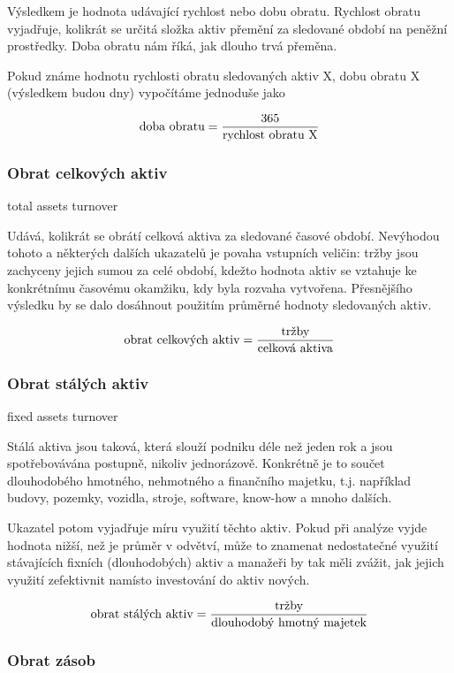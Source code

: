 Výsledkem je hodnota udávající rychlost nebo dobu obratu. Rychlost obratu vyjadřuje, kolikrát se určitá složka aktiv přemění za sledované období na peněžní prostředky. Doba obratu nám říká, jak dlouho trvá přeměna.

Pokud známe hodnotu rychlosti obratu sledovaných aktiv X, dobu obratu X (výsledkem budou dny) vypočítáme jednoduše jako 

$$\text{doba obratu} = \dfrac{\text{365}}{\text{rychlost obratu X}}$$

\subsubsection{Obrat celkových aktiv}

total assets turnover

Udává, kolikrát se obrátí celková aktiva za sledované časové období. Nevýhodou tohoto a některých dalších ukazatelů je povaha vstupních veličin: tržby jsou zachyceny jejich sumou za celé období, kdežto hodnota aktiv se vztahuje ke konkrétnímu časovému okamžiku, kdy byla rozvaha vytvořena. Přesnějšího výsledku by se dalo dosáhnout použitím průměrné hodnoty sledovaných aktiv. 

$$\text{obrat celkových aktiv} = \dfrac{\text{tržby}}{\text{celková aktiva}}$$

\subsubsection{Obrat stálých aktiv}

fixed assets turnover

Stálá aktiva jsou taková, která slouží podniku déle než jeden rok a jsou spotřebovávána postupně, nikoliv jednorázově. Konkrétně je to součet dlouhodobého hmotného, nehmotného a finančního majetku, t.j. například budovy, pozemky, vozidla, stroje, software, know-how a mnoho dalších.

Ukazatel potom vyjadřuje míru využití těchto aktiv. Pokud při analýze vyjde hodnota nižší, než je průměr v odvětví, může to znamenat nedostatečné využití stávajících fixních (dlouhodobých) aktiv a manažeři by tak měli zvážit, jak jejich využití zefektivnit namísto investování do aktiv nových.

$$\text{obrat stálých aktiv} = \dfrac{\text{tržby}}{\text{dlouhodobý hmotný majetek}}$$

\subsubsection{Obrat zásob}


